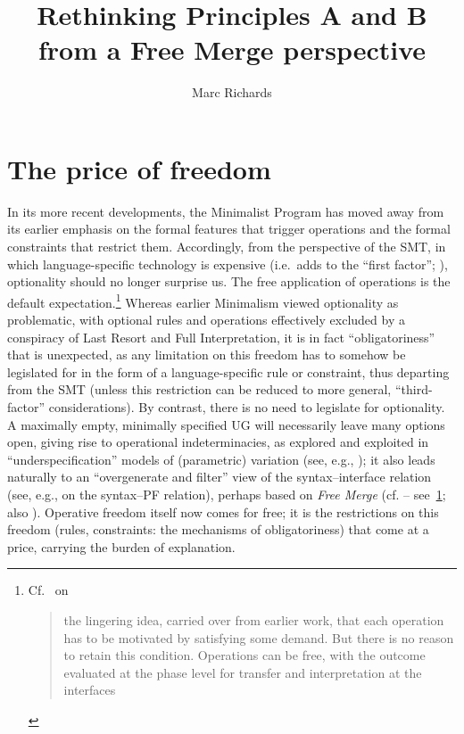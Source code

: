 \documentclass[output=paper]{langsci/langscibook}
\author{Marc Richards\affiliation{Queen's University Belfast}}
\title{Rethinking Principles A and B from a Free Merge perspective}
\begin{document}
\glsresetall

\section{The price of freedom}\label{sec:key:22.1}

\largerpage
In its more recent developments, the Minimalist Program has moved away from its
earlier emphasis on the formal features that trigger operations and the formal
constraints that restrict them. Accordingly, from the perspective of the
\gls{SMT}, in which language-specific technology is expensive (i.e.\ adds to
the \enquote{first factor}; \citealt{Chomsky2005}), optionality should no
longer surprise us. The free application of operations is the default
expectation.\footnote{Cf.\ \citet[10--11]{Chomsky2015} on \blockquote{the
        lingering idea, carried over from earlier work, that each operation has
        to be motivated by satisfying some demand.  But there is no reason to
        retain this condition.  Operations can be free, with the outcome
evaluated at the phase level for transfer and interpretation at the
interfaces}.\label{fn:22.1}} Whereas earlier Minimalism \citep{Chomsky1995}
viewed optionality as problematic, with optional rules and operations
effectively excluded by a conspiracy of Last Resort and Full Interpretation, it
is in fact \enquote{obligatoriness} that is unexpected, as any limitation on
this freedom has to somehow be legislated for in the form of a
language-specific rule or constraint, thus departing from the \gls{SMT} (unless
this restriction can be reduced to more general, \enquote{third-factor}
considerations). By contrast, there is no need to legislate for optionality. A
maximally empty, minimally specified \gls{UG} will necessarily
leave many options open, giving rise to operational indeterminacies, as
explored and exploited in \enquote{underspecification} models of (parametric)
variation (see, e.g.,
\citealt{Uriagereka1994,BibRich2006,BerCho2011,Richards2008b,Kandybowicz2009,Boeckx2011b,RobHol2010});
it also leads naturally to an \enquote{overgenerate and filter} view of the
syntax--interface relation (see, e.g., \citealt{Richards2004,Richards2007b} on the
syntax--\gls{PF} relation), perhaps based on \emph{Free Merge} (cf.
\citealt{Chomsky2007,Chomsky2008,Chomsky2013,Chomsky2015} --
see~\cref{fn:22.1}; also \citealt{Boeckx2011b}). Operative freedom itself now
comes for free; it is the restrictions on this freedom (rules, constraints: the
mechanisms of obligatoriness) that come at a price, carrying the burden of
explanation.
\end{document}
